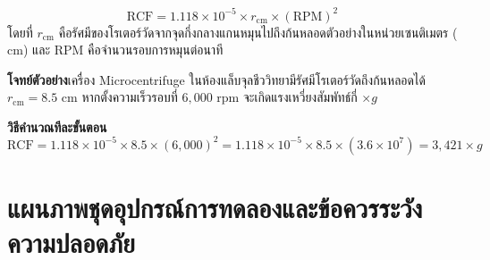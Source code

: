 \begin{conceptbox}
\begin{equation}
    \text{RCF} = 1.118 \times 10^{-5} \times r_{\text{cm}} \times (\text{RPM})^2
\end{equation}
โดยที่ $r_{\text{cm}}$ คือรัศมีของโรเตอร์วัดจากจุดกึ่งกลางแกนหมุนไปถึงก้นหลอดตัวอย่างในหน่วยเซนติเมตร ($\text{cm}$) และ $\text{RPM}$ คือจำนวนรอบการหมุนต่อนาที
\end{conceptbox}

\begin{worked}
\textbf{โจทย์ตัวอย่าง}\quad เครื่อง Microcentrifuge ในห้องแล็บจุลชีววิทยามีรัศมีโรเตอร์วัดถึงก้นหลอดได้ $r_{\text{cm}} = 8.5\text{ cm}$ หากตั้งความเร็วรอบที่ $6{,}000\text{ rpm}$ จะเกิดแรงเหวี่ยงสัมพัทธ์กี่ $\times g$

\textbf{วิธีคำนวณทีละขั้นตอน}
\[
    \text{RCF} = 1.118 \times 10^{-5} \times 8.5 \times (6{,}000)^2 = 1.118 \times 10^{-5} \times 8.5 \times (3.6 \times 10^7) = 3{,}421 \times g
\]
\end{worked}

\section{แผนภาพชุดอุปกรณ์การทดลองและข้อควรระวังความปลอดภัย}

